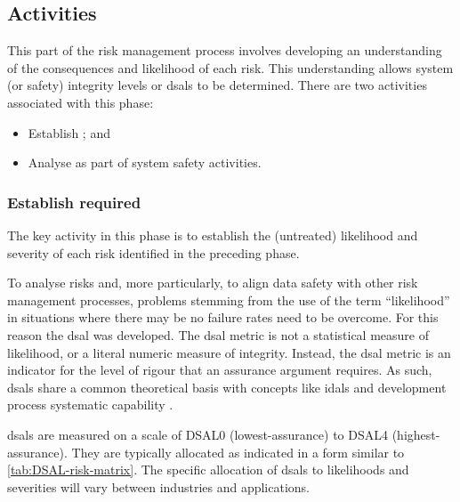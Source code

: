\subsection{Activities}
This part of the risk management process involves developing an understanding of the consequences and likelihood of each risk. This understanding allows system (or safety) \gls{integrity} levels or \glspl{dsal} to be determined.
%
%
There are two activities associated with this phase:
\begin{itemize}
	\item Establish ; and
	\item Analyse  as part of system safety activities.
\end{itemize}
%
\subsubsection{Establish required }
\label{bkm:DSAL-table-section}
The key activity in this phase is to establish the (untreated) likelihood and severity of each risk identified in the preceding phase.

To analyse risks and, more particularly, to align data safety with other risk management processes, problems stemming from the use of the term ``likelihood'' in situations where there may be no failure rates need to be overcome. For this reason the \gls{dsal} was developed. The \gls{dsal} metric is not a statistical measure of likelihood, or a literal numeric measure of \gls{integrity}. Instead, the \gls{dsal} metric is an indicator for the level of rigour that an assurance argument requires. As such, \glspl{dsal} share a common theoretical basis with concepts like \glspl{idal}  \cite{citation:arp4754a2010guidelines} and development process systematic capability \cite{citation:iec615083}.

\glspl{dsal} are measured on a scale of DSAL0 (lowest-assurance) to DSAL4 (highest-assurance). They are typically allocated as indicated in a form similar to  \autoref{tab:DSAL-risk-matrix}. The specific allocation of \glspl{dsal} to likelihoods and severities will vary between industries and applications.


